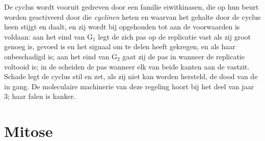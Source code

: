 \begin{proposition}[Controlepunten]\label{prop:b1:replication-mitosis:checkpoints}
De cyclus wordt vooruit gedreven door een familie eiwitkinasen, die op hun beurt
worden geactiveerd door  die \emph{cyclinen} heten en waarvan het gehalte
door de cyclus heen stijgt en daalt, en zij wordt bij \emph{}
opgehouden tot aan de voorwaarden is voldaan: aan het eind van G$_1$ legt de 
zich pas op de replicatie vast als zij groot genoeg is, gevoed is en het signaal om
te delen heeft gekregen, en als haar  onbeschadigd is; aan het eind van G$_2$
gaat zij de  pas in wanneer de replicatie voltooid is; in de  scheiden
de  pas wanneer elk  van beide kanten aan de 
vastzit. Schade legt de cyclus stil en zet, als zij niet kan worden hersteld, de
dood van de  in gang. De moleculaire machinerie van deze regeling hoort bij het
deel van jaar 3; haar falen is kanker.
\end{proposition}

\section{Mitose}

